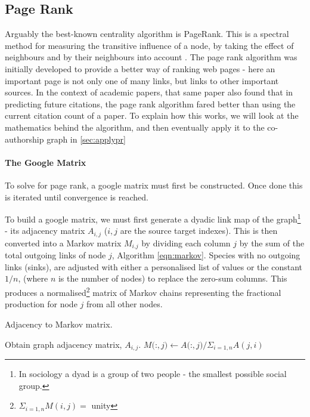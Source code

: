      
% 
% 






\subsection{Page Rank}
Arguably the best-known centrality algorithm is PageRank. This is a spectral method for measuring the transitive influence of a node, by taking the effect of neighbours and by their neighbours into account \citep{neoj4}. The page rank algorithm was initially developed to provide a better way of ranking web pages \citep{google}- here an important page is not only one of many links, but links to other important sources. In the context of academic papers, that same paper also found that in predicting future citations, the page rank algorithm fared better than using the current citation count of a paper. 
To explain how this works, we will look at the mathematics behind the algorithm, and then eventually apply it to the co-authorship graph in \autoref{sec:applypr}

\paragraph{The Google Matrix}
To solve for page rank, a google matrix must first be constructed. Once done this is iterated until convergence is reached. 

To build a google matrix, we must first generate a dyadic link map of the graph\footnote{In sociology a dyad is a group of two people - the smallest possible social group.} - its adjacency matrix $A_{i,j}$ ($i,j$ are the source target indexes). This is then converted into a Markov matrix $M_{i.j}$ by dividing each column $j$ by the sum of the total outgoing links of node $j$, Algorithm \ref{eqn:markov}.
Species with no outgoing links (sinks), are adjusted with either a personalised list of values or the constant $1/n$, (where $n$ is the number of nodes) to replace the zero-sum columns. This produces a normalised\footnote{ \: $\Sigma_{i=1,n} M(i,j) = $ unity} matrix of Markov chains representing the fractional production for node $j$ from all other nodes.

\begin{algorithm} \caption{Adjacency to Markov matrix.}
\begin{algorithmic}[1]
\State Obtain graph adjacency matrix, $A_{i,j}$.
\Repeat
{}
\State $M($:$,j) \gets A($:$,j) / \Sigma_{i=1,n} A(j,i)$
\EndFor
{}

\end{algorithmic}\label{eqn:markov}
\end{algorithm}



